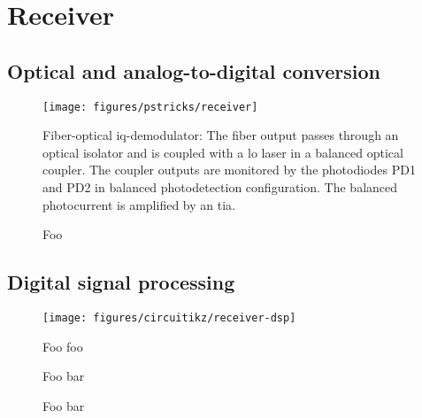 \section{Receiver}


\subsection{Optical and analog-to-digital conversion}

\begin{figure}[htb]
	\centering
	\texttt{[image: figures/pstricks/receiver]}
	\caption{Fiber-optical \gls{iq}-demodulator: The fiber output passes through an optical isolator and is coupled with a \gls{lo} laser in a balanced optical coupler. The coupler outputs are monitored by the photodiodes PD1 and PD2 in balanced photodetection configuration. The balanced photocurrent is amplified by an \gls{tia}.}
\end{figure}

\begin{figure}[htb]
	\centering
	
	\caption{Foo}
\end{figure}

\FloatBarrier
\subsection{Digital signal processing}


\begin{figure}[htb]
	\centering
	\texttt{[image: figures/circuitikz/receiver-dsp]}
	\caption{Foo foo}
\end{figure}

\begin{figure}[htb]
	\centering
	
	\caption{Foo bar}
\end{figure}

\begin{figure}[htb]
	\centering
	
	\caption{Foo bar}
\end{figure}
